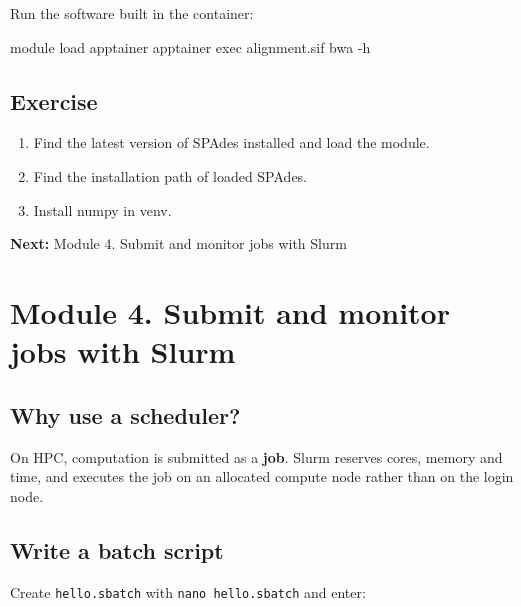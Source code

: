 \documentclass[
]{book}
\newenvironment{Shaded}{\begin{snugshade}}{\end{snugshade}}
\newcommand{\AttributeTok}[1]{\textcolor[rgb]{0.13,0.29,0.53}{#1}}
\newcommand{\ExtensionTok}[1]{#1}
\newcommand{\NormalTok}[1]{#1}
\providecommand{\tightlist}{%
  \setlength{\itemsep}{0pt}\setlength{\parskip}{0pt}}
\begin{document}
Run the software built in the container:

\begin{Shaded}
\begin{Highlighting}[]
\ExtensionTok{module}\NormalTok{ load apptainer}
\ExtensionTok{apptainer}\NormalTok{ exec alignment.sif bwa }\AttributeTok{{-}h}
\end{Highlighting}
\end{Shaded}

\section{Exercise}\label{exercise-1}

\begin{enumerate}
\def\labelenumi{\arabic{enumi}.}
\tightlist
\item
  Find the latest version of SPAdes installed and load the module.
\item
  Find the installation path of loaded SPAdes.
\item
  Install numpy in venv.
\end{enumerate}

\textbf{Next:} Module 4. Submit and monitor jobs with Slurm

\chapter{Module 4. Submit and monitor jobs with Slurm}\label{module-4.-submit-and-monitor-jobs-with-slurm}

\section{Why use a scheduler?}\label{why-use-a-scheduler}

On HPC, computation is submitted as a \textbf{job}. Slurm reserves cores, memory and time, and executes the job on an allocated compute node rather than on the login node.

\section{Write a batch script}\label{write-a-batch-script}

Create \texttt{hello.sbatch} with \texttt{nano\ hello.sbatch} and enter:
\end{document}
